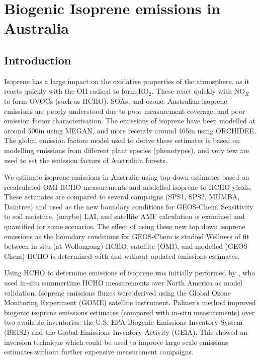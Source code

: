 
%
%



\chapter{Biogenic Isoprene emissions in Australia} %
\label{BioIsop}
  
\section{Introduction}  
\label{BioIsop:intro}  
  
  Isoprene has a large impact on the oxidative properties of the atmosphere, as it reacts quickly with the OH radical to form RO$_2$.
  These react quickly with NO$_X$ to form OVOCs (such as HCHO), SOAs, and ozone.
  Australian isoprene emissions are poorly understood due to poor measurement coverage, and poor emission factor characterisation.
  The emissions of isoprene have been modelled at around 500\tgcpyr in \textcite{Guenther1995,Guenther2006} using MEGAN, and more recently around 465\tgcpyr in \textcite{Messina2016} using ORCHIDEE.
  The global emission factors model used to derive these estimates is based on modelling emissions from different plant species (phenotypes), and very few are used to set the emission factors of Australian forests.
  
  
  We estimate isoprene emissions in Australia using top-down estimates based on recalculated OMI HCHO measurements and modelled isoprene to HCHO yields.
  These estimates are compared to several campaigns (SPS1, SPS2, MUMBA, Daintree) and used as the new boundary conditions for GEOS-Chem.
  Sensitivity to soil moisture, (maybe) LAI, and satellite AMF calculation is examined and quantified for some scenarios.
  The effect of using these new top down isoprene emissions as the boundary conditions for GEOS-Chem is studied
  Wellness of fit between in-situ (at Wollongong) HCHO, satellite (OMI), and modelled (GEOS-Chem) HCHO is determined with and without updated emissions estimates.
  
  Using HCHO to determine emissions of isoprene was initially performed by \textcite{Palmer2001, Palmer2003}, who used in-situ summertime HCHO measurements over North America as model validation.
  Isoprene emissions fluxes were derived using the Global Ozone Monitoring Experiment (GOME) satellite instrument.
  Palmer's method improved biogenic isoprene emissions estimates (compared with in-situ measurements) over two available inventories: the U.S. EPA Biogenic Emissions Inventory System (BEIS2) and the Global Emissions Inventory Activity (GEIA).
  This showed an inversion technique which could be used to improve large scale emissions estimates without further expensive measurement campaigns.
  
